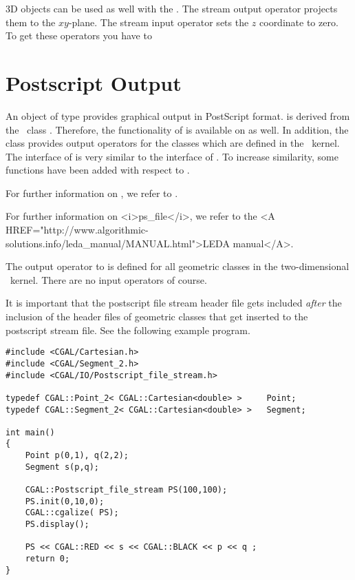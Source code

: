 3D objects can be used as well with the . The stream output
operator \ccc{<<} projects them to the $xy$-plane. The stream input
operator \ccc{>>} sets the $z$ coordinate to zero.
To get these operators you have to 



\section{Postscript Output}

An object of type  provides graphical output in PostScript
format.
 is derived from the \leda\ class .
Therefore, the functionality of  is available on 
as well.
In addition, the class  provides output 
operators for the classes which are defined in the \cgal\ kernel.
The interface of  is very similar to the interface 
of . 
To increase similarity, some functions have been added with respect to .
\begin{ccTexOnly}
For further information on , we refer to \cite{cgal:mnsu-lum}.
\end{ccTexOnly}
\begin{ccHtmlOnly}
For further information on <i>ps_file</i>, we refer to the 
<A HREF="http://www.algorithmic-solutions.info/leda_manual/MANUAL.html">LEDA manual</A>.
\end{ccHtmlOnly}

The output operator to  is defined for all geometric classes 
in the two-dimensional \cgal\ kernel. There are no input operators of course.

It is important that the postscript file stream header file gets included
{\em after} the inclusion of the header files of geometric classes
that get inserted to the postscript stream file. See the following example program.

\begin{verbatim}
#include <CGAL/Cartesian.h>
#include <CGAL/Segment_2.h>
#include <CGAL/IO/Postscript_file_stream.h>

typedef CGAL::Point_2< CGAL::Cartesian<double> >     Point;
typedef CGAL::Segment_2< CGAL::Cartesian<double> >   Segment;

int main()
{
    Point p(0,1), q(2,2);
    Segment s(p,q);

    CGAL::Postscript_file_stream PS(100,100);
    PS.init(0,10,0);
    CGAL::cgalize( PS);
    PS.display();

    PS << CGAL::RED << s << CGAL::BLACK << p << q ;
    return 0;
}
\end{verbatim} 

